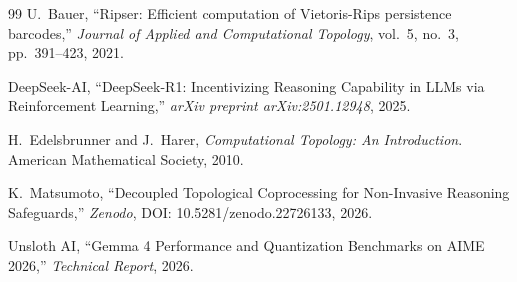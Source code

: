\documentclass[11pt,a4paper]{article}
\begin{document}
\begin{thebibliography}{99}
U.~Bauer, ``Ripser: Efficient computation of Vietoris-Rips persistence barcodes,'' \textit{Journal of Applied and Computational Topology}, vol.~5, no.~3, pp.~391--423, 2021.

DeepSeek-AI, ``DeepSeek-R1: Incentivizing Reasoning Capability in LLMs via Reinforcement Learning,'' \textit{arXiv preprint arXiv:2501.12948}, 2025.

H.~Edelsbrunner and J.~Harer, \textit{Computational Topology: An Introduction}. American Mathematical Society, 2010.

K.~Matsumoto, ``Decoupled Topological Coprocessing for Non-Invasive Reasoning Safeguards,'' \textit{Zenodo}, DOI: 10.5281/zenodo.22726133, 2026.

Unsloth AI, ``Gemma 4 Performance and Quantization Benchmarks on AIME 2026,'' \textit{Technical Report}, 2026.
\end{thebibliography}
\end{document}
